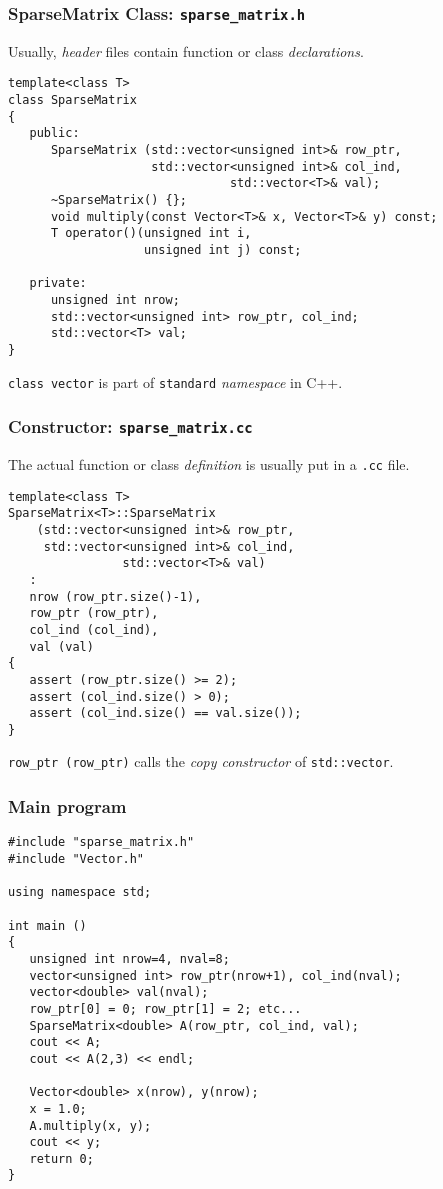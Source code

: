 \documentclass[10pt,xcolor=svgnames]{beamer}
\begin{document}
\begin{frame}[fragile]
\frametitle{SparseMatrix Class: {\tt sparse\_matrix.h}}
Usually, {\em header} files contain function or class {\em declarations}.

\begin{lstlisting}
template<class T>
class SparseMatrix
{
   public:
      SparseMatrix (std::vector<unsigned int>& row_ptr,
                    std::vector<unsigned int>& col_ind,
                               std::vector<T>& val);
      ~SparseMatrix() {};
      void multiply(const Vector<T>& x, Vector<T>& y) const;
      T operator()(unsigned int i,
                   unsigned int j) const;

   private:
      unsigned int nrow;
      std::vector<unsigned int> row_ptr, col_ind;
      std::vector<T> val;
}
\end{lstlisting}
{\tt class vector} is part of {\tt standard} {\em namespace} in C++.
\end{frame}
\begin{frame}[fragile]
\frametitle{Constructor: {\tt sparse\_matrix.cc}}

The actual function or class {\em definition} is usually put in a {\tt *.cc} file.

\begin{lstlisting}
template<class T>
SparseMatrix<T>::SparseMatrix
    (std::vector<unsigned int>& row_ptr,
     std::vector<unsigned int>& col_ind,
                std::vector<T>& val)
   :
   nrow (row_ptr.size()-1),
   row_ptr (row_ptr),
   col_ind (col_ind),
   val (val)
{
   assert (row_ptr.size() >= 2);
   assert (col_ind.size() > 0);
   assert (col_ind.size() == val.size());
}
\end{lstlisting}
{\tt row\_ptr (row\_ptr)} calls the {\em copy constructor} of {\tt std::vector}.
\end{frame}
\begin{frame}[fragile]
\frametitle{Main program}

\begin{lstlisting}
#include "sparse_matrix.h"
#include "Vector.h"

using namespace std;

int main ()
{
   unsigned int nrow=4, nval=8;
   vector<unsigned int> row_ptr(nrow+1), col_ind(nval);
   vector<double> val(nval);
   row_ptr[0] = 0; row_ptr[1] = 2; etc...
   SparseMatrix<double> A(row_ptr, col_ind, val);
   cout << A;
   cout << A(2,3) << endl;

   Vector<double> x(nrow), y(nrow);
   x = 1.0;
   A.multiply(x, y);
   cout << y;
   return 0;
}
\end{lstlisting}

\end{frame}
\end{document}
